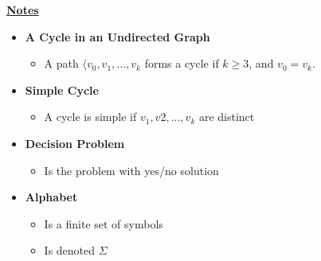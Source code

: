 \documentclass[12pt]{article}
\begin{document}
\begin{enumerate}[1.]


    \underline{\textbf{Notes}}

    \begin{itemize}
        \item \textbf{A Cycle in an Undirected Graph}

        \begin{itemize}
            \item A path $\langle v_0,v_1,...,v_k$ forms a cycle if $k \geq 3$, and $v_0 = v_k$.
        \end{itemize}

        \item \textbf{Simple Cycle}

        \begin{itemize}
            \item A cycle is simple if $v_1, v2, ..., v_k$ are distinct
        \end{itemize}
        \item \textbf{Decision Problem}

        \begin{itemize}
            \item Is the problem with yes/no solution
        \end{itemize}

        \bigskip

        \item \textbf{Alphabet}

        \begin{itemize}
            \item Is a finite set of symbols
            \item Is denoted $\Sigma$


\end{itemize}
\end{itemize}
\end{enumerate}
\end{document}
